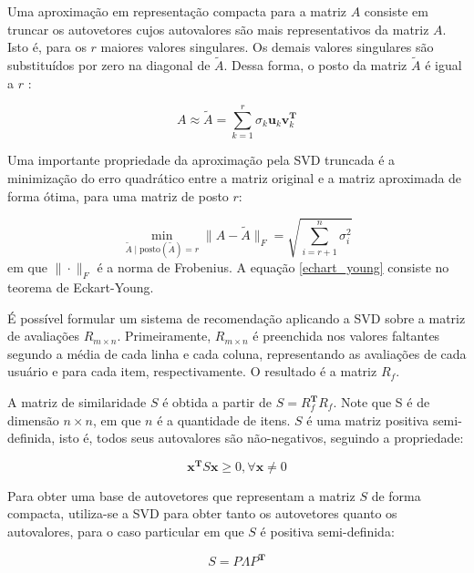 Uma aproximação em representação compacta para a matriz $A$ consiste em truncar
os autovetores cujos autovalores são mais representativos da matriz $A$. Isto é,
para os $r$ maiores valores singulares. Os demais valores singulares são
substituídos por zero na diagonal de $\tilde{A}$. Dessa forma, o posto da matriz
$\tilde{A}$ é igual a $r$ \cite{brunton2022data}:

\begin{equation}
    A \approx \tilde{A} = \sum_{k=1}^{r}\sigma_k \mathbf{u}_k \mathbf{v}_k^{\mathbf{T}}
\end{equation}

Uma importante propriedade da aproximação pela SVD truncada é a minimização do
erro quadrático entre a matriz original e a matriz aproximada de forma ótima,
para uma matriz de posto $r$:

\begin{equation} \label{echart_young}
    \min_{\tilde{A} \mid \text{posto}(\tilde{A}) = r } \|A - \tilde{A}\|_F = \sqrt{\sum_{i=r+1}^{n}\sigma_i^2}
\end{equation}
em que $\| \cdot \|_F$ é a norma de Frobenius. A equação \ref{echart_young}
consiste no teorema de Eckart-Young.


É possível formular um sistema de recomendação aplicando a SVD sobre a matriz de
avaliações $R_{m \times n}$. Primeiramente, $R_{m \times n}$ é preenchida nos
valores faltantes segundo a média de cada linha e cada coluna, representando as
avaliações de cada usuário e para cada item, respectivamente. O resultado é a
matriz $R_f$.

A matriz de similaridade $S$ é obtida a partir de $S = R_f^{\mathbf{T} }R_f$.
Note que S é de dimensão $n \times n$, em que $n$ é a quantidade de itens. $S$ é
uma matriz positiva semi-definida, isto é, todos seus autovalores são
não-negativos, seguindo a propriedade:

\begin{equation}
    \mathbf{x}^{\mathbf{T}} S \mathbf{x} \geq 0, \forall \mathbf{x} \neq 0
\end{equation}

 Para obter uma base de autovetores que representam a matriz $S$ de forma
 compacta, utiliza-se a SVD para obter tanto os autovetores quanto os autovalores,
 para o caso particular em que $S$ é positiva semi-definida:

\begin{equation}
    S = P \Lambda P^{\mathbf{T}}
\end{equation}

